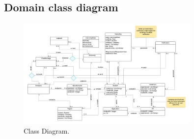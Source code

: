\subsection{Domain class diagram}
\begin{figure}[H]
        \centering
        \includegraphics[width=0.8\textwidth]{RASD/Assets/ClassDiagram/ClassDiagram3.png}
        \caption{Class Diagram.}
        \label{fig:Class Diagram.}
    \end{figure}

